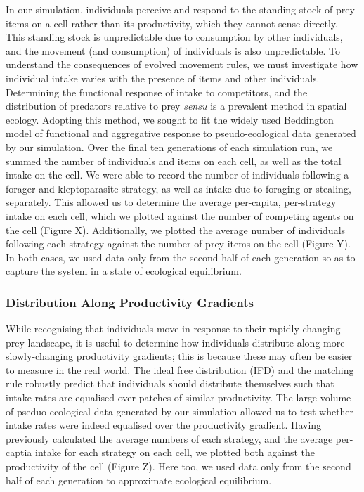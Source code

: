 \documentclass[11pt]{article}
\begin{document}
In our simulation, individuals perceive and respond to the standing stock of prey items on a cell rather than its productivity, which they cannot sense directly.
This standing stock is unpredictable due to consumption by other individuals, and the movement (and consumption) of individuals is also unpredictable.
To understand the consequences of evolved movement rules, we must investigate how individual intake varies with the presence of items and other individuals.
Determining the functional response of intake to competitors, and the distribution of predators relative to prey \textit{sensu} \citet{meer1997} is a prevalent method in spatial ecology.
Adopting this method, we sought to fit the widely used Beddington model of functional and aggregative response to pseudo-ecological data generated by our simulation.
Over the final ten generations of each simulation run, we summed the number of individuals and items on each cell, as well as the total intake on the cell.
We were able to record the number of individuals following a forager and kleptoparasite strategy, as well as intake due to foraging or stealing, separately.
This allowed us to determine the average per-capita, per-strategy intake on each cell, which we plotted against the number of competing agents on the cell (Figure X).
Additionally, we plotted the average number of individuals following each strategy against the number of prey items on the cell (Figure Y).
In both cases, we used data only from the second half of each generation so as to capture the system in a state of ecological equilibrium.

\subsubsection{Distribution Along Productivity Gradients}

While recognising that individuals move in response to their rapidly-changing prey landscape, it is useful to determine how individuals distribute along more slowly-changing productivity gradients; 
this is because these may often be easier to measure in the real world.
The ideal free distribution (IFD) and the matching rule robustly predict that individuals should distribute themselves such that intake rates are equalised over patches of similar productivity.
The large volume of pseduo-ecological data generated by our simulation allowed us to test whether intake rates were indeed equalised over the productivity gradient.
Having previously calculated the average numbers of each strategy, and the average per-captia intake for each strategy on each cell, we plotted both against the productivity of the cell (Figure Z).
Here too, we used data only from the second half of each generation to approximate ecological equilibrium.
\end{document}
